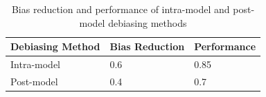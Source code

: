 \documentclass{article}
\begin{document}
\begin{table}
\centering
\begin{tabular}{|l|l|l|}
\hline
\textbf{Debiasing Method} & \textbf{Bias Reduction} & \textbf{Performance} \\
\hline
Intra-model & 0.6 & 0.85 \\
\hline
Post-model & 0.4 & 0.7 \\
\hline
\end{tabular}
\caption{Bias reduction and performance of intra-model and post-model debiasing methods}
\end{table}
\end{document}
